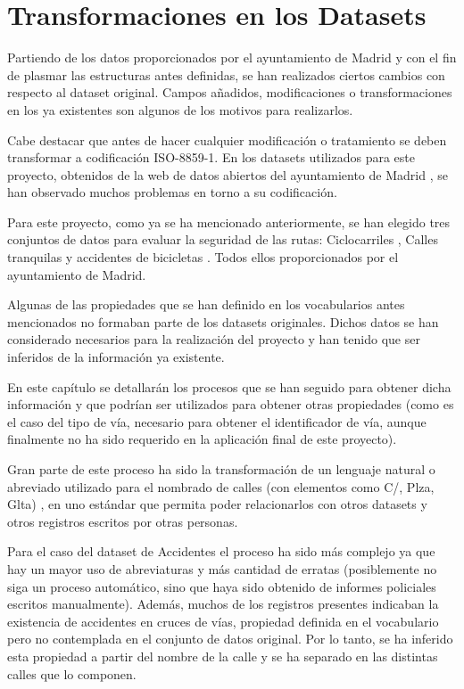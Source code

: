 \chapter{Transformaciones en los Datasets}

Partiendo de los datos proporcionados por el ayuntamiento de Madrid y con el fin de plasmar las estructuras antes definidas, se han realizados ciertos cambios con respecto al dataset original. Campos añadidos, modificaciones o transformaciones en los ya existentes son algunos de los motivos para realizarlos.

Cabe destacar que antes de hacer cualquier modificación o tratamiento se deben transformar a codificación ISO-8859-1. En los datasets utilizados para este proyecto, obtenidos de la web de datos abiertos del ayuntamiento de Madrid \cite{datosabiertos_ayuntmadrid}, se han observado muchos problemas en torno a su codificación.

Para este proyecto, como ya se ha mencionado anteriormente, se han elegido tres conjuntos de datos para evaluar la seguridad de las rutas: Ciclocarriles \cite{datosMadrid_ciclocarriles}, Calles tranquilas \cite{datosMadrid_callesTranquilas} y accidentes de bicicletas \cite{datosMadrid_accidentesDeBicicleta}. Todos ellos proporcionados por el ayuntamiento de Madrid.

Algunas de las propiedades que se han definido en los vocabularios antes mencionados no formaban parte de los datasets originales. Dichos datos se han considerado necesarios para la realización del proyecto y han tenido que ser inferidos de la información ya existente.

En este capítulo se detallarán los procesos que se han seguido para obtener dicha información y que podrían ser utilizados para obtener otras propiedades (como es el caso del tipo de vía, necesario para obtener el identificador de vía, aunque finalmente no ha sido requerido en la aplicación final de este proyecto).

Gran parte de este proceso ha sido la transformación de un lenguaje natural o abreviado utilizado para el nombrado de calles (con elementos como C/, Plza, Glta) , en uno estándar que permita poder relacionarlos con otros datasets y otros registros escritos por otras personas.

Para el caso del dataset de Accidentes el proceso ha sido más complejo ya que hay un mayor uso de abreviaturas y más cantidad de erratas (posiblemente no siga un proceso automático, sino que haya sido obtenido de informes policiales escritos manualmente). Además, muchos de los registros presentes indicaban la existencia de accidentes en cruces de vías, propiedad definida en el vocabulario pero no contemplada en el conjunto de datos original. Por lo tanto, se ha inferido esta propiedad a partir del nombre de la calle y se ha separado en las distintas calles que lo componen.

